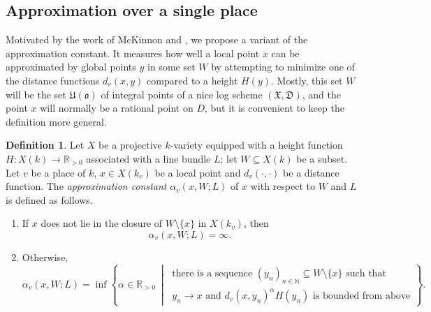 \documentclass[a4paper, twoside, 11pt]{amsart}
\theoremstyle{definition}
\newtheorem{definition}[theorem]{Definition}
\newcommand{\mD}{\mathfrak{D}}
\newcommand{\mU}{\mathfrak{U}}
\newcommand{\mX}{\mathfrak{X}}
\newcommand{\fo}{\mathfrak{o}}
\newcommand{\NN}{\mathbb{N}}
\newcommand{\RR}{\mathbb{R}}
\begin{document}
\subsection{Approximation over a single place}
Motivated by the work of McKinnon and \cite{McK,McK-Roth}, we propose a variant of the approximation constant. It measures how well a local point $x$ can be approximated by global points $y$ in some set $W$ by attempting to minimize one of the distance functions $d_v(x,y)$ compared to a height $H(y)$.
Mostly, this set $W$ will be the set $\mU(\fo)$ of integral points of a nice log scheme $(\mX,\mD)$, and the point $x$ will normally be a rational point on $D$, but it is convenient to keep the definition more general.
\begin{definition}\label{def:alpha}
	Let $X$ be a projective $k$-variety equipped with a height function $H\colon X(k)\to\RR_{>0}$ associated with a line bundle $L$; let $W\subseteq X(k)$ be a subset. Let $v$ be a place of $k$, $x\in X(k_v)$ be a local point and $d_v(\cdot,\cdot)$ be a distance function. The \emph{approximation constant} $\alpha_v(x, W; L)$ of $x$  with respect to $W$ and $L$ is defined as follows.
	\begin{enumerate}
		\item If $x$ does not lie in the closure of $W \setminus \{x\}$ in $X(k_v)$, then
		\begin{equation*}
			\alpha_v(x, W; L)=\infty.
		\end{equation*}
		\item Otherwise, 
		\begin{equation*}
			\alpha_v(x, W; L) = \inf\left\{
			\alpha \in \RR_{>0}
			\ \middle|\  \substack{
				\text{there is a sequence $(y_n)_{n\in \NN} \subseteq W\setminus \{x\}$ such that}\\
				y_n\to x \text{ and } d_v(x, y_n)^\alpha H(y_n) \text{ is bounded from above}
			}
			\right\}.
		\end{equation*}
	\end{enumerate}
\end{definition}
\end{document}
